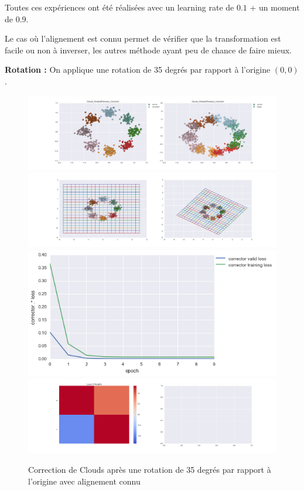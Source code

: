 Toutes ces expériences ont été réalisées avec un learning rate de $0.1$ + un moment de $0.9$.



Le cas où l'alignement est connu permet de vérifier que la transformation est facile ou non 
à inverser, les autres méthode ayant peu de chance de faire mieux.

{\Large \textbf{Rotation :}}  On applique une rotation de 35 degrés par rapport à l'origine $(0,0)$.

\begin{figure}[H] %
\centering
\includegraphics[width=\linewidth]{fig/24-05-2016/clouds/Clouds_RotatedPairwise_Corrector-DATA.png}
\includegraphics[width=\linewidth]{fig/24-05-2016/clouds/Clouds_RotatedPairwise_Corrector-GridCheck.png}
\includegraphics[width=0.45\linewidth]{fig/24-05-2016/clouds/Clouds_RotatedPairwise_Corrector-Learning_curve.png}
\includegraphics[width=\linewidth]{fig/24-05-2016/clouds/Clouds_RotatedPairwise_Corrector-W.png}
\caption{Correction de Clouds après une rotation de 35 degrés par rapport à l'origine avec alignement connu}
\label{fig:recap-clouds-rot-pairwise}
\end{figure}

